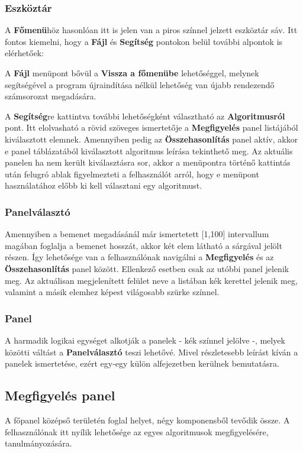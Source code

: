 \documentclass{elteikthesis}
\begin{document}
\subsubsection{Eszköztár}
A \textbf{Főmenü}höz hasonlóan itt is jelen van a piros színnel jelzett eszköztár sáv. Itt fontos kiemelni, hogy a \textbf{Fájl} és \textbf{Segítség} pontokon belül további alpontok is elérhetőek:\par
A \textbf{Fájl} menüpont bővül a \textbf{Vissza a főmenübe} lehetőséggel, melynek segítségével a program újraindítása nélkül lehetőség van újabb rendezendő számsorozat megadására.\par
A \textbf{Segítség}re kattintva további lehetőségként választható az \textbf{Algoritmusról} pont. Itt elolvasható a rövid szöveges ismertetője a \textbf{Megfigyelés} panel listájából kiválasztott elemnek. Amennyiben pedig az \textbf{Összehasonlítás} panel aktív, akkor e panel táblázatából kiválasztott algoritmus leírása tekinthető meg. Az aktuális panelen ha nem került kiválasztásra sor, akkor a menüpontra történő kattintás után felugró ablak figyelmezteti a felhasználót arról, hogy e menüpont használatához előbb ki kell választani egy algoritmust.
\subsubsection{Panelválasztó}
Amennyiben a bemenet megadásánál már ismertetett [1,100] intervallum magában foglalja a bemenet hosszát, akkor két elem látható a sárgával jelölt részen. Így lehetősége van a felhasználónak navigálni a \textbf{Megfigyelés} és az \textbf{Összehasonlítás} panel között. Ellenkező esetben csak az utóbbi panel jelenik meg. Az aktuálisan megjelenített felület neve a listában kék kerettel jelenik meg, valamint a másik elemhez képest világosabb szürke színnel.
\subsubsection{Panel}
A harmadik logikai egységet alkotják a panelek - kék színnel jelölve -, melyek közötti váltást a \textbf{Panelválasztó} teszi lehetővé. Mivel részletesebb leírást kíván a panelek ismertetése, ezért egy-egy külön alfejezetben kerülnek bemutatásra.

\subsection{Megfigyelés panel}
A főpanel középső területén foglal helyet, négy komponensből tevődik össze. A felhasználónak itt nyílik lehetősége az egyes algoritmusok megfigyelésére, tanulmányozására.
\end{document}
